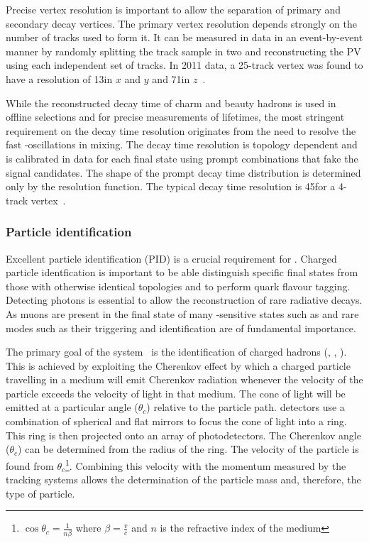 Precise vertex resolution is important to allow the separation of primary and secondary decay vertices. The primary vertex resolution depends strongly on the number of tracks used to form it. It can be measured in data in an event-by-event manner by randomly splitting the track sample in two and reconstructing the PV using each independent set of tracks. In 2011 data, a 25-track vertex was found to have a resolution of 13\mum in $x$ and $y$ and 71\mum in $z$~\cite{lhcb-perf}.
 
While the reconstructed decay time of charm and beauty hadrons is used in offline selections and for precise measurements of lifetimes, the most stringent requirement on the decay time resolution originates from the need to resolve the fast \Bs-\Bsb oscillations in mixing. The decay time resolution is topology dependent and is calibrated in data for each final state using prompt combinations that fake the signal candidates. The shape of the prompt decay time distribution is determined only by the resolution function. The typical decay time resolution is 45\fs for a 4-track vertex~\cite{lhcb-perf}.

\subsubsection{Particle identification}
\label{sec:lhcb:pid}

Excellent particle identification (PID) is a crucial requirement for \lhcb. Charged particle identfication is important to be able distinguish specific final states from those with otherwise identical topologies and to perform \bquark quark flavour tagging. Detecting photons is essential to allow the reconstruction of rare radiative decays. As muons are present in the final state of many \CP-sensitive states such as \BsToJPsiPhi and rare modes such as \BsToMuMu their triggering and identification are of fundamental importance.

The primary goal of the \rich system~\cite{lhcb-tdr,rich-perf} is the identification of charged hadrons (\pion, \kaon, \proton). This is achieved by exploiting the Cherenkov effect by which a charged particle travelling in a medium will emit Cherenkov radiation whenever the velocity of the particle exceeds the velocity of light in that medium. The cone of light will be emitted at a particular angle ($\theta_{c}$) relative to the particle path. \rich detectors use a combination of spherical and flat mirrors to focus the cone of light into a ring. This ring is then projected onto an array of photodetectors. The Cherenkov angle ($\theta_{c}$) can be determined from the radius of the ring. The velocity of the particle is found from $\theta_{c}$\footnote{$\cos\theta_{c} = \frac{1}{n\beta}$ where $\beta = \frac{v}{c}$ and $n$ is the refractive index of the medium}. Combining this velocity with the momentum measured by the tracking systems allows the determination of the particle mass and, therefore, the type of particle. 

